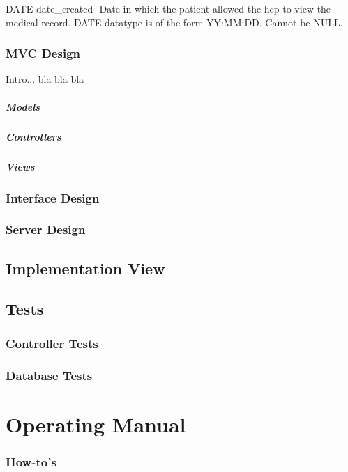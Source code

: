\documentclass[12pt]{report}
\begin{document}
DATE date_created-  Date in which the patient allowed the hcp to view the medical record.  DATE datatype is of the form YY:MM:DD.  Cannot be NULL.\\


\subsection{MVC Design}

Intro... bla bla bla
\paragraph{Models}
\paragraph{Controllers}
\paragraph{Views}

\subsection{Interface Design}
\subsection{Server Design}

\section{Implementation View}

\section{Tests}
\subsection{Controller Tests}
\subsection{Database Tests}


\chapter{Operating Manual}
\subsection{How-to's}
\end{document}
